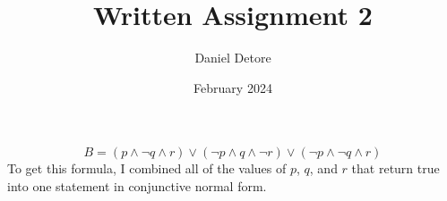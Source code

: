 \documentclass{article}
\title{Written Assignment 2}
\author{Daniel Detore}
\date{February 2024}
\begin{document}
\maketitle

\section{}
\begin{equation*} \label{eq1}
B = (p \land \neg q \land r) \lor (\neg p \land q \land \neg r) \lor (\neg p \land \neg q \land r)
\end{equation*}
To get this formula, I combined all of the values of $p$, $q$, and $r$ that return true into one statement in conjunctive normal form.
\end{document}
